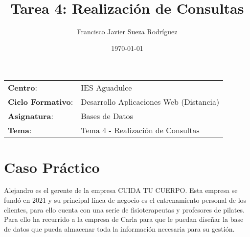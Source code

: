 


\title{
\vspace{10ex}
\normalfont \normalsize
\Huge \textbf{Tarea 4: Realización de Consultas}
}
\author{Francisco Javier Sueza Rodríguez}
\date{\normalsize\today}



\maketitle

\thispagestyle{empty}

\vspace{68ex}

\begin{center}
    \begin{tabular}{l l}
        \textbf{Centro}: & IES Aguadulce \\
        \textbf{Ciclo Formativo}: & Desarrollo Aplicaciones Web (Distancia)\\
        \textbf{Asignatura}: & Bases de Datos\\
        \textbf{Tema}: & Tema 4 -  Realización de Consultas\\
    \end{tabular}
\end{center}

\newpage

\tableofcontents

\newpage

\listoffigures

\newpage

\section{Caso Práctico}
Alejandro es el gerente de la empresa CUIDA TU CUERPO. Esta empresa se fundó en 2021 y su principal línea de negocio es el entrenamiento personal de los clientes, para ello cuenta con una serie de fisioterapeutas y profesores de pilates. Para ello ha recurrido a la empresa de Carla para que le puedan diseñar la base de datos que pueda almacenar toda la información necesaria para su gestión.

